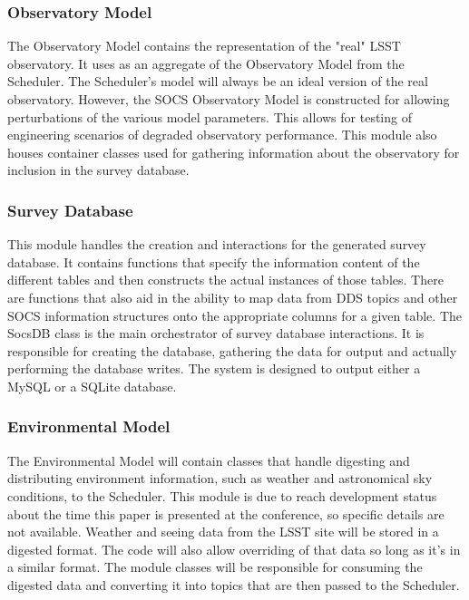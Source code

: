 \documentclass[]{spie}  %
\begin{document}
\subsubsection{Observatory Model}

The Observatory Model contains the representation of the "real" LSST observatory. It uses as an aggregate of the Observatory Model from the Scheduler. The Scheduler's model will always be an ideal version of the real observatory. However, the SOCS Observatory Model is constructed for allowing perturbations of the various model parameters. This allows for testing of engineering scenarios of degraded observatory performance. This module also houses container classes used for gathering information about the observatory for inclusion in the survey database. 

\subsubsection{Survey Database}

This module handles the creation and interactions for the generated survey database. It contains functions that specify the information content of the different tables and then constructs the actual instances of those tables. There are functions that also aid in the ability to map data from DDS topics and other SOCS information structures onto the appropriate columns for a given table. The SocsDB class is the main orchestrator of survey database interactions. It is responsible for creating the database, gathering the data for output and actually performing the database writes. The system is designed to output either a MySQL or a SQLite database.

\subsubsection{Environmental Model}

The Environmental Model will contain classes that handle digesting and distributing environment information, such as weather and astronomical sky conditions, to the Scheduler. This module is due to reach development status about the time this paper is presented at the conference, so specific details are not available. Weather and seeing data from the LSST site will be stored in a digested format. The code will also allow overriding of that data so long as it's in a similar format. The module classes will be responsible for consuming the digested data and converting it into topics that are then passed to the Scheduler.
\end{document}
